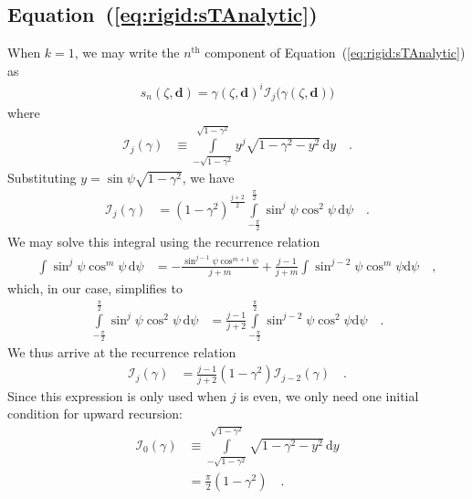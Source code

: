 \documentclass[modern]{aastex62}
\begin{document}
\subsection{Equation~(\ref{eq:rigid:sTAnalytic})}
%
When $k = 1$, we may write the $n^\mathrm{th}$ component
of Equation~(\ref{eq:rigid:sTAnalytic}) as
%
\begin{align}
    s_n(\zeta, \mathbf{d}) = 
        \gamma(\zeta, \mathbf{d})^{i}
        \mathcal{I}_{j}\big(\gamma(\zeta, \mathbf{d})\big)
\end{align}
%
where
%
\begin{align}
    \mathcal{I}_j(\gamma) &\equiv
    \int\limits_{-\sqrt{1-\gamma^2}}^{\sqrt{1-\gamma^2}}
        y^{j}
        \sqrt{1 - \gamma^2 - y^2} \,
    \mathrm{d}y
    \quad.
\end{align}
%
Substituting $y = \sin\psi\sqrt{1 - \gamma^2}$, we have
%
\begin{align}
    \mathcal{I}_j(\gamma) &=
    (1 - \gamma^2)^{\frac{j + 2}{2}}
    \int\limits_{-\frac{\pi}{2}}^{\frac{\pi}{2}}
        \sin^j\psi
        \cos^2\psi \,
    \mathrm{d}\psi
    \quad.
\end{align}
%
We may solve this integral using the recurrence relation
%
\begin{align}
    \int
        \sin^j\psi
        \cos^m\psi \,
    \mathrm{d}\psi
    &=
    -\frac{\sin^{j-1}\psi \cos^{m+1}\psi}{j + m}
    +
    \frac{j - 1}{j + m}\int\sin^{j-2}\psi \cos^m\psi \mathrm{d}\psi
    \quad ,
\end{align}
%
which, in our case, simplifies to
%
\begin{align}
    \int\limits_{-\frac{\pi}{2}}^{\frac{\pi}{2}}
        \sin^j\psi
        \cos^2\psi \,
    \mathrm{d}\psi
    &=
    \frac{j - 1}{j + 2}\int\limits_{-\frac{\pi}{2}}^{\frac{\pi}{2}}\sin^{j-2}\psi \cos^2\psi \mathrm{d}\psi
    \quad.
\end{align}
%
We thus arrive at the recurrence relation
%
\begin{align}
    \label{eq:app:Ij}
    \mathcal{I}_j(\gamma) &=
    \frac{j - 1}{j + 2}
    (1 - \gamma^2)
    \mathcal{I}_{j-2}(\gamma)
    \quad.
\end{align}
%
Since this expression is only used when $j$ is even, we only need one
initial condition for upward recursion:
%
\begin{align}
    \label{eq:app:I0}
    \mathcal{I}_0(\gamma) &\equiv
    \int\limits_{-\sqrt{1-\gamma^2}}^{\sqrt{1-\gamma^2}}
        \sqrt{1 - \gamma^2 - y^2} \,
    \mathrm{d}y
    \nonumber \\
    &= \frac{\pi}{2}(1 - \gamma^2)
    \quad.
\end{align}


\end{document}
